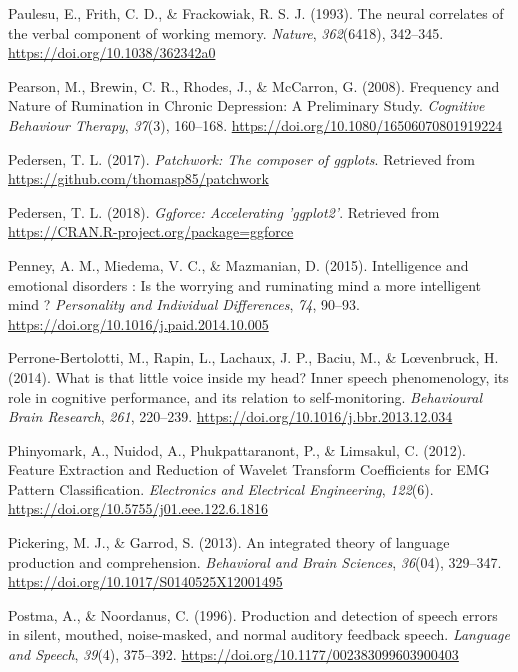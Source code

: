 \documentclass[a4paper,12pt,twoside,openright,oldfontcommands]{memoir}
\begin{document}
\leavevmode\hypertarget{ref-paulesu_neural_1993}{}%
Paulesu, E., Frith, C. D., \& Frackowiak, R. S. J. (1993). The neural correlates of the verbal component of working memory. \emph{Nature}, \emph{362}(6418), 342--345. \url{https://doi.org/10.1038/362342a0}

\leavevmode\hypertarget{ref-pearson_frequency_2008}{}%
Pearson, M., Brewin, C. R., Rhodes, J., \& McCarron, G. (2008). Frequency and Nature of Rumination in Chronic Depression: A Preliminary Study. \emph{Cognitive Behaviour Therapy}, \emph{37}(3), 160--168. \url{https://doi.org/10.1080/16506070801919224}

\leavevmode\hypertarget{ref-R-patchwork}{}%
Pedersen, T. L. (2017). \emph{Patchwork: The composer of ggplots}. Retrieved from \url{https://github.com/thomasp85/patchwork}

\leavevmode\hypertarget{ref-R-ggforce}{}%
Pedersen, T. L. (2018). \emph{Ggforce: Accelerating 'ggplot2'}. Retrieved from \url{https://CRAN.R-project.org/package=ggforce}

\leavevmode\hypertarget{ref-Penney2015}{}%
Penney, A. M., Miedema, V. C., \& Mazmanian, D. (2015). Intelligence and emotional disorders : Is the worrying and ruminating mind a more intelligent mind ? \emph{Personality and Individual Differences}, \emph{74}, 90--93. \url{https://doi.org/10.1016/j.paid.2014.10.005}

\leavevmode\hypertarget{ref-Perrone-Bertolotti2014}{}%
Perrone-Bertolotti, M., Rapin, L., Lachaux, J. P., Baciu, M., \& Lœvenbruck, H. (2014). What is that little voice inside my head? Inner speech phenomenology, its role in cognitive performance, and its relation to self-monitoring. \emph{Behavioural Brain Research}, \emph{261}, 220--239. \url{https://doi.org/10.1016/j.bbr.2013.12.034}

\leavevmode\hypertarget{ref-phinyomark_feature_2012}{}%
Phinyomark, A., Nuidod, A., Phukpattaranont, P., \& Limsakul, C. (2012). Feature Extraction and Reduction of Wavelet Transform Coefficients for EMG Pattern Classification. \emph{Electronics and Electrical Engineering}, \emph{122}(6). \url{https://doi.org/10.5755/j01.eee.122.6.1816}

\leavevmode\hypertarget{ref-pickering_integrated_2013}{}%
Pickering, M. J., \& Garrod, S. (2013). An integrated theory of language production and comprehension. \emph{Behavioral and Brain Sciences}, \emph{36}(04), 329--347. \url{https://doi.org/10.1017/S0140525X12001495}

\leavevmode\hypertarget{ref-postma_production_1996}{}%
Postma, A., \& Noordanus, C. (1996). Production and detection of speech errors in silent, mouthed, noise-masked, and normal auditory feedback speech. \emph{Language and Speech}, \emph{39}(4), 375--392. \url{https://doi.org/10.1177/002383099603900403}
\end{document}
